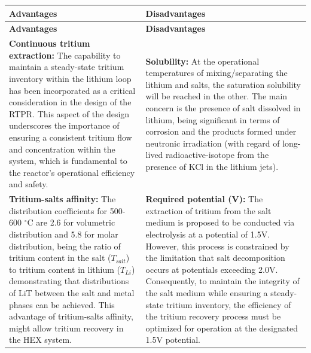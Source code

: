 \begin{longtable}{p{7.5cm}p{7.5cm}}  
	\rule[-0.3cm]{0pt}{0.8cm} \textbf{Advantages} & \textbf{Disadvantages} \\
	\hline
	\endfirsthead
	
	\rule[-0.3cm]{0pt}{0.8cm} \textbf{Advantages} & \textbf{Disadvantages} \\
	\hline
	\endhead
	
	\endlastfoot
	
	\rule[-0.3cm]{0pt}{0.8cm} \noindent \textbf{Continuous tritium extraction:} The capability to maintain a steady-state tritium inventory within the lithium loop has been incorporated as a critical consideration in the design of the RTPR. This aspect of the design underscores the importance of ensuring a consistent tritium flow and concentration within the system, which is fundamental to the reactor's operational efficiency and safety.  & \textbf{Solubility:} At the operational temperatures of mixing/separating the lithium and salts, the saturation solubility will be reached in the other. The main concern is the presence of salt dissolved in lithium, being significant in terms of corrosion and the products formed under neutronic irradiation (with regard of long-lived radioactive-isotope from the presence of KCl in the lithium jets).  \\
	\hline
	
	
	\rule[-0.3cm]{0pt}{0.8cm} \textbf{Tritium-salts affinity:} The distribution coefficients for 500-600 $^\circ$C are 2.6 for volumetric distribution and 5.8 for molar distribution, being the ratio of tritium content in the salt ($T_{salt}$) to tritium content in lithium ($T_{Li}$) demonstrating that distributions of LiT between the salt and metal phases can be achieved. This advantage of tritium-salts affinity, might allow tritium recovery in the HEX system. & \textbf{Required potential (V):} The extraction of tritium from the salt medium is proposed to be conducted via electrolysis at a potential of 1.5V. However, this process is constrained by the limitation that salt decomposition occurs at potentials exceeding 2.0V. Consequently, to maintain the integrity of the salt medium while ensuring a steady-state tritium inventory, the efficiency of the tritium recovery process must be optimized for operation at the designated 1.5V potential.  \\ \hline
	

\end{longtable}
